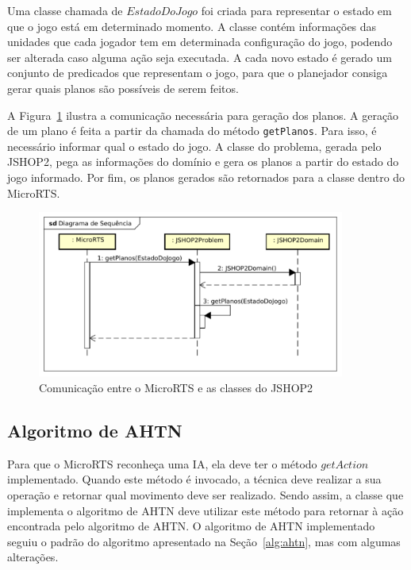 Uma classe chamada de $EstadoDoJogo$ foi criada para representar o estado em que o jogo está em determinado momento.
A classe contém informações das unidades que cada jogador tem em determinada configuração do jogo, podendo ser alterada caso alguma ação seja executada.
A cada novo estado é gerado um conjunto de predicados que representam o jogo, para que o planejador consiga gerar quais planos são possíveis de serem feitos.

A Figura~\ref{fig:planos} ilustra a comunicação necessária para geração dos planos.
A geração de um plano é feita a partir da chamada do método \texttt{getPlanos}.
Para isso, é necessário informar qual o estado do jogo.
A classe do problema, gerada pelo JSHOP2, pega as informações do domínio e gera os planos a partir do estado do jogo informado.
Por fim, os planos gerados são retornados para a classe dentro do MicroRTS.

\begin{figure}[ht]
	\centering
	\includegraphics[width=0.9\textwidth]{fig/gerarPlano.pdf}
	\caption{Comunicação entre o MicroRTS e as classes do JSHOP2}
	\label{fig:planos}
\end{figure}

\subsection{Algoritmo de AHTN}

Para que o MicroRTS reconheça uma IA, ela deve ter o método $\mathit{getAction}$ implementado.
Quando este método é invocado, a técnica deve realizar a sua operação e retornar qual movimento deve ser realizado.
Sendo assim, a classe que implementa o algoritmo de AHTN deve utilizar este método para retornar à ação encontrada pelo algoritmo de AHTN.
O algoritmo de AHTN implementado seguiu o padrão do algoritmo apresentado na Seção~\ref{alg:ahtn}, mas com algumas alterações.

